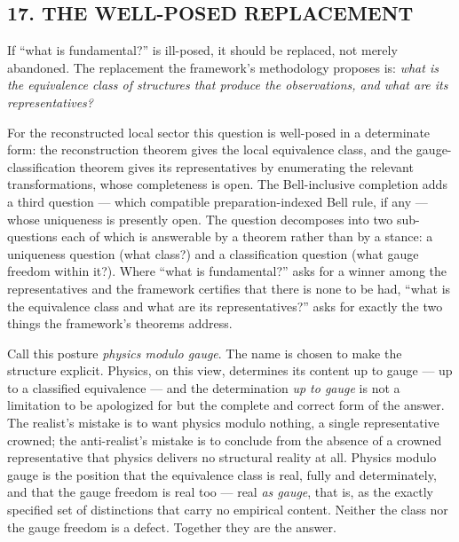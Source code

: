 \documentclass[
]{article}
\begin{document}
\hypertarget{the-well-posed-replacement}{%
\subsection{17. THE WELL-POSED
REPLACEMENT}\label{the-well-posed-replacement}}

If ``what is fundamental?'' is ill-posed, it should be replaced, not
merely abandoned. The replacement the framework's methodology proposes
is: \emph{what is the equivalence class of structures that produce the
observations, and what are its representatives?}

For the reconstructed local sector this question is well-posed in a
determinate form: the reconstruction theorem gives the local equivalence
class, and the gauge-classification theorem gives its representatives by
enumerating the relevant transformations, whose completeness is open.
The Bell-inclusive completion adds a third question --- which compatible
preparation-indexed Bell rule, if any --- whose uniqueness is presently
open. The question decomposes into two sub-questions each of which is
answerable by a theorem rather than by a stance: a uniqueness question
(what class?) and a classification question (what gauge freedom within
it?). Where ``what is fundamental?'' asks for a winner among the
representatives and the framework certifies that there is none to be
had, ``what is the equivalence class and what are its representatives?''
asks for exactly the two things the framework's theorems address.

Call this posture \emph{physics modulo gauge}. The name is chosen to
make the structure explicit. Physics, on this view, determines its
content up to gauge --- up to a classified equivalence --- and the
determination \emph{up to gauge} is not a limitation to be apologized
for but the complete and correct form of the answer. The realist's
mistake is to want physics modulo nothing, a single representative
crowned; the anti-realist's mistake is to conclude from the absence of a
crowned representative that physics delivers no structural reality at
all. Physics modulo gauge is the position that the equivalence class is
real, fully and determinately, and that the gauge freedom is real too
--- real \emph{as gauge}, that is, as the exactly specified set of
distinctions that carry no empirical content. Neither the class nor the
gauge freedom is a defect. Together they are the answer.
\end{document}
